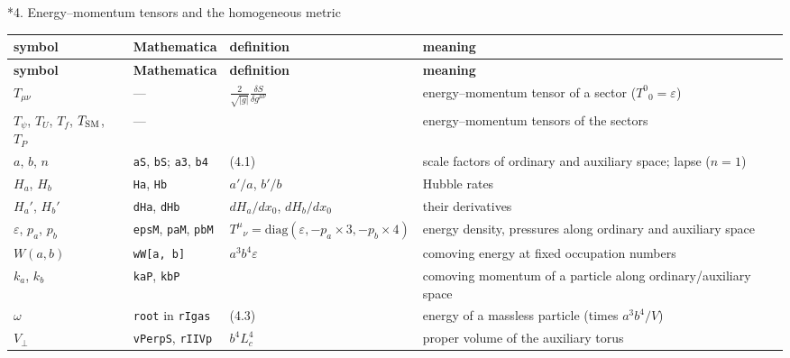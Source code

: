 \documentclass[10pt,a4paper]{article}
\makeatletter
\renewcommand\section{\@startsection{section}{1}{\z@}{-3.5ex \@plus -1ex \@minus -.2ex}{2.3ex \@plus.2ex}{\normalfont\Large\bfseries\raggedright}}
\makeatother
\begin{document}
\section*{4. Energy–momentum tensors and the homogeneous metric}
{\small
\begin{longtable}{>{\raggedright\arraybackslash}p{}>{\raggedright\arraybackslash}p{}>{\raggedright\arraybackslash}p{}>{\raggedright\arraybackslash}p{}}
\toprule
\textbf{symbol} & \textbf{Mathematica} & \textbf{definition} & \textbf{meaning} \\
\midrule\endfirsthead
\toprule
\textbf{symbol} & \textbf{Mathematica} & \textbf{definition} & \textbf{meaning} \\
\midrule\endhead
\endfoot
\bottomrule\endlastfoot
$T_{\mu\nu}$ & — & $\frac2{\sqrt{|g|}}\frac{\delta S}{\delta g^{\mu\nu}}$ & energy–momentum tensor of a sector ($T^0{}_0=\varepsilon$) \\
$T_\psi$, $T_U$, $T_f$, $T_{\rm SM}$, $T_P$ & — &  & energy–momentum tensors of the sectors \\
$a$, $b$, $n$ & \texttt{aS}, \texttt{bS}; \texttt{a3}, \texttt{b4} & (4.1) & scale factors of ordinary and auxiliary space; lapse ($n=1$) \\
$H_a$, $H_b$ & \texttt{Ha}, \texttt{Hb} & $a'/a$, $b'/b$ & Hubble rates \\
$H_a'$, $H_b'$ & \texttt{dHa}, \texttt{dHb} & $dH_a/dx_0$, $dH_b/dx_0$ & their derivatives \\
$\varepsilon$, $p_a$, $p_b$ & \texttt{epsM}, \texttt{paM}, \texttt{pbM} & $T^\mu{}_\nu=\mathrm{diag}(\varepsilon,-p_a\times3,-p_b\times4)$ & energy density, pressures along ordinary and auxiliary space \\
$W(a,b)$ & \texttt{wW[a, b]} & $a^3b^4\varepsilon$ & comoving energy at fixed occupation numbers \\
$k_a$, $k_b$ & \texttt{kaP}, \texttt{kbP} &  & comoving momentum of a particle along ordinary/auxiliary space \\
$\omega$ & \texttt{root} in \texttt{rIgas} & (4.3) & energy of a massless particle (times $a^3b^4/V$) \\
$V_\perp$ & \texttt{vPerpS}, \texttt{rIIVp} & $b^4L_c^4$ & proper volume of the auxiliary torus \\

\end{longtable}}
\end{document}
